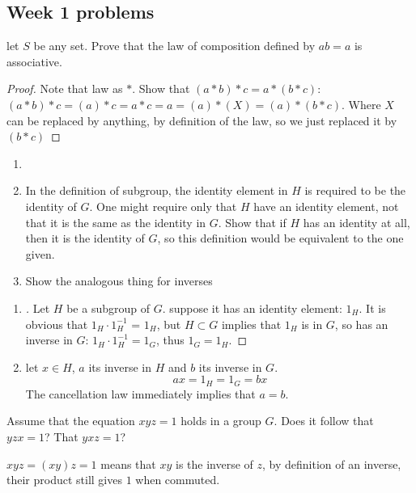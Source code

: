\subsection{Week 1 problems}

\begin{boxedProblem}[2.1.7]
let $S$ be any set. Prove that the law of composition defined by $ab = a$ is associative.
\end{boxedProblem}
\begin{proof}
    Note that law as $*$. Show that $(a*b)*c = a*(b*c)$:
    $(a*b)*c = (a)*c = a*c = a = (a)*(X) = (a)*(b*c)$. Where $X$ can be replaced by anything, by definition of the law, so we just replaced it by $(b*c)$
\end{proof}

\begin{boxedProblem}[2.2.15]
    \begin{enumerate}
        \item[]
        \item
    In the definition of subgroup, the identity element in $H$ is required to be the identity of $G$. One might require only that $H$ have an identity element, not that it is the same as the identity in $G$. Show that if $H$ has an identity at all, then it is the identity of $G$, so this definition would be equivalent to the one given.
    \item Show the analogous thing for inverses
    \end{enumerate}

\end{boxedProblem}
\begin{enumerate}
    \item
\begin{proof}[]
    Let $H$ be a subgroup of $G$. suppose it has an identity element: $1_H$. It is obvious that $1_H\cdot 1_H^{-1}$ = $1_H$, but $H \subset G$ implies that $1_H$ is in $G$, so has an inverse in $G$: $1_H\cdot 1_H^{-1} = 1_G$, thus $1_G = 1_H$.
\end{proof}
\item let $x \in H$, $a$ its inverse in $H$ and $b$ its inverse in $G$.\begin{equation*}
    ax = 1_H = 1_G = bx
\end{equation*}
The cancellation law immediately implies that $a = b$.
\end{enumerate}

\begin{boxedProblem}[2.1.5]
    Assume that the equation $xyz = 1$ holds in a group $G$. Does it follow that $yzx = 1$? That $yxz = 1$?
\end{boxedProblem}
$xyz = (xy)z = 1$ means that $xy$ is the inverse of $z$, by definition of an inverse, their product still gives $1$ when commuted.

